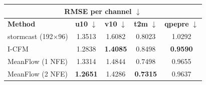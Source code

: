 \documentclass[border=10pt]{standalone}
\begin{document}
\begin{tabular}{lcccc}
\toprule
\multicolumn{5}{c}{\textbf{RMSE per channel} $\downarrow$} \\
\midrule
\textbf{Method} & \textbf{u10} $\downarrow$ & \textbf{v10} $\downarrow$ & \textbf{t2m} $\downarrow$ & \textbf{qpepre} $\downarrow$ \\
\midrule
stormcast (192$\times$96) & 1.3513 & 1.6082 & 0.8023 & 1.0292 \\
I-CFM & 1.2838 & \textbf{1.4085} & 0.8498 & \textbf{0.9590} \\
MeanFlow (1 NFE) & 1.3314 & 1.4844 & 0.7498 & 0.9655 \\
MeanFlow (2 NFE) & \textbf{1.2651} & 1.4286 & \textbf{0.7315} & 0.9637 \\
\bottomrule
\end{tabular}
\end{document}
